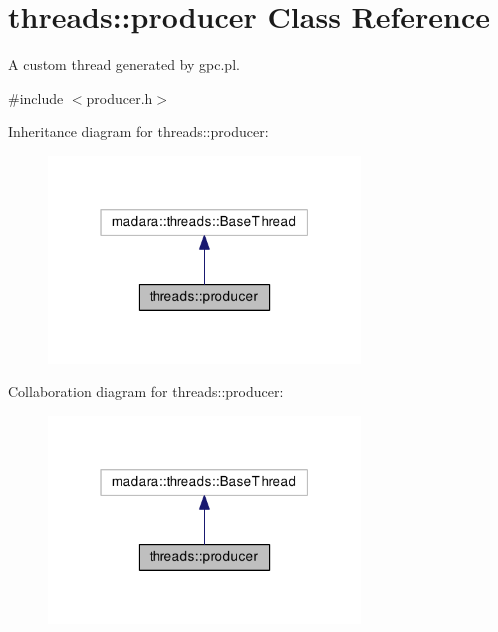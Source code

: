 \hypertarget{classthreads_1_1producer}{}\section{threads\+:\+:producer Class Reference}
\label{classthreads_1_1producer}


A custom thread generated by gpc.\+pl.  




{\ttfamily \#include $<$producer.\+h$>$}



Inheritance diagram for threads\+:\+:producer\+:\nopagebreak
\begin{figure}[H]
\begin{center}
\leavevmode
\includegraphics[width=235pt]{dd/d09/classthreads_1_1producer__inherit__graph}
\end{center}
\end{figure}


Collaboration diagram for threads\+:\+:producer\+:\nopagebreak
\begin{figure}[H]
\begin{center}
\leavevmode
\includegraphics[width=235pt]{d7/de6/classthreads_1_1producer__coll__graph}
\end{center}
\end{figure}
